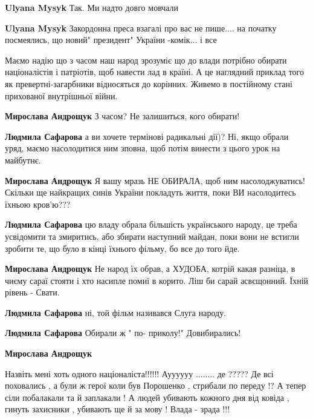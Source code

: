 \begin{itemize}
\begin{itemize}
\textbf{Ulyana Mysyk} Так. Ми надто довго мовчали

\textbf{Ulyana Mysyk}
Закордонна преса взагалі про вас не пише.... на початку посмеялись, що новий" президент" України -комік... і все
\end{itemize} %


Маємо надію що з часом наш народ зрозуміє що до влади потрібно обирати
націоналістів і патріотів, щоб навести лад в країні. А це наглядний приклад
того як превертні-загарбники відносяться до корінних. Живемо в постійному стані
прихованої внутрішньої війни.

\begin{itemize} %
\textbf{Мирослава Андрощук} З часом? Не залишиться, кого обирати!

\textbf{Людмила Сафарова} а ви хочете термінові радикальні дії)? Ні, якщо обрали уряд, маємо насолодитися ним зповна, щоб потім винести з цього урок на майбутнє.

\textbf{Мирослава Андрощук} Я вашу мразь НЕ ОБИРАЛА, щоб ним насолоджуватись! Скільки ще найкращих синів України покладуть життя, поки ВИ насолодитесь їхньою кров'ю???

\textbf{Людмила Сафарова} цю владу обрала більшість українського народу, це треба усвідомити та змиритись, або збирати наступний майдан, поки вони не встигли зробити те, що було в кінці їхнього фільму, бо все до того йде.

\textbf{Мирослава Андрощук} Не народ їх обрав, а ХУДОБА, котрій какая разніца, в чиєму сараї стояти і хто насипле помиї в корито. Ліш би сарай асвєщонний. Їхній рівень - Свати.

\textbf{Людмила Сафарова} ні, той фільм називався Слуга народу.

\textbf{Людмила Сафарова} Обирали ж " по- приколу!"
Довибирались!

\textbf{Мирослава Андрощук} 

Назвіть мені хоть одного націоналіста!!!!!! Ауууууу ........ де ????? Де всі
поховались , а були ж герої коли був Порошенко , стрибали по переду !? А тепер
сіли побалакали та й заплакали ! А людей убивають кожного дня від ковіда ,
гинуть захисники , убивають ще й за мову ! Влада - зрада !!!


\end{itemize}
\end{itemize}
